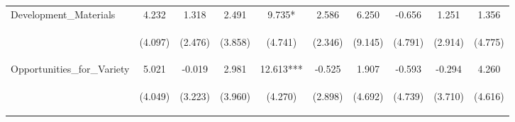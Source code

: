 \begin{tabular}{lccccccccc}
\noalign{\smallskip}Development\_Materials & 4.232 & 1.318 & 2.491 & 9.735* & 2.586 & 6.250 & -0.656 & 1.251 & 1.356\\
 & \begin{footnotesize}(4.097)\end{footnotesize} & \begin{footnotesize}(2.476)\end{footnotesize} & \begin{footnotesize}(3.858)\end{footnotesize} & \begin{footnotesize}(4.741)\end{footnotesize} & \begin{footnotesize}(2.346)\end{footnotesize} & \begin{footnotesize}(9.145)\end{footnotesize} & \begin{footnotesize}(4.791)\end{footnotesize} & \begin{footnotesize}(2.914)\end{footnotesize} & \begin{footnotesize}(4.775)\end{footnotesize}\\
\noalign{\smallskip}Opportunities\_for\_Variety & 5.021 & -0.019 & 2.981 & 12.613*** & -0.525 & 1.907 & -0.593 & -0.294 & 4.260\\
 & \begin{footnotesize}(4.049)\end{footnotesize} & \begin{footnotesize}(3.223)\end{footnotesize} & \begin{footnotesize}(3.960)\end{footnotesize} & \begin{footnotesize}(4.270)\end{footnotesize} & \begin{footnotesize}(2.898)\end{footnotesize} & \begin{footnotesize}(4.692)\end{footnotesize} & \begin{footnotesize}(4.739)\end{footnotesize} & \begin{footnotesize}(3.710)\end{footnotesize} & \begin{footnotesize}(4.616)\end{footnotesize}\\

\end{tabular}
